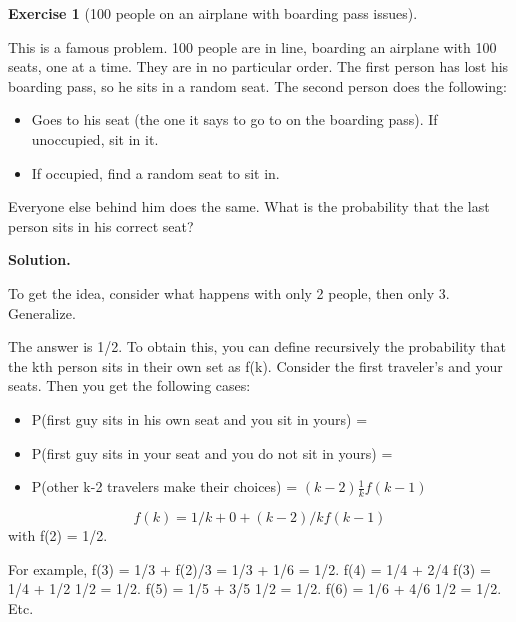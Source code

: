 \documentclass[10pt,]{book}
\theoremstyle{plain}
\theoremstyle{definition}
\theoremstyle{definition}
\theoremstyle{definition}
\newtheorem{exercise}[theorem]{Exercise}
\numberwithin{equation}{section}
\begin{document}
\begin{exercise}[{100 people on an airplane with boarding pass issues}]\label{exercise-28}

	This is a famous problem.  100 people are in line, boarding an airplane with 100 seats, one at a time. They are in no particular order. The first person has lost his boarding pass, so he sits in a random seat. The second person does the following:

	\leavevmode%
\begin{itemize}[label=\textbullet]
\item{}Goes to his seat (the one it says to go to on the boarding pass). If unoccupied, sit in it.%
\item{}If occupied, find a random seat to sit in.%
\end{itemize}

	Everyone else behind him does the same. What is the probability that the last person sits in his correct seat?
\par\smallskip
\noindent\textbf{Solution.}\hypertarget{solution-7}{}\quad

	To get the idea, consider what happens with only 2 people, then only 3. Generalize. 
\par

	The answer is 1/2. To obtain this, you can define recursively the probability that the kth person sits in their own set as f(k).  Consider the first traveler's and your seats. Then you get the following cases:
	\leavevmode%
\begin{itemize}[label=\textbullet]
\item{}P(first guy sits in his own seat and you sit in yours) =  %
\item{}P(first guy sits in your seat and you do not sit in yours) =  %
\item{}P(other k-2 travelers make their choices) = \((k-2) \frac{1}{k} f(k-1)\)%
\end{itemize}

	\begin{equation*}f(k) = 1/k + 0 + (k-2)/k f(k-1)\end{equation*}
	with f(2) = 1/2.
\par

	For example,
	f(3) = 1/3 + f(2)/3 = 1/3 + 1/6 = 1/2.   
	f(4) = 1/4 + 2/4 f(3) = 1/4 + 1/2 1/2 = 1/2.
	f(5) = 1/5 + 3/5 1/2 = 1/2.
	f(6) = 1/6 + 4/6 1/2 = 1/2. Etc.
\end{exercise}
\typeout{************************************************}
\typeout{************************************************}
\end{document}
